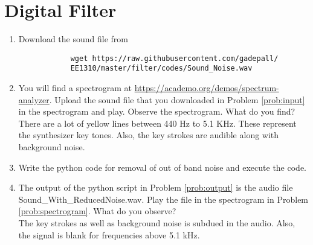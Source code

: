 \documentclass[journal,12pt,twocolumn]{IEEEtran}
\renewcommand\thesection{\arabic{section}}
\begin{document}
	\section{Digital Filter}
	\begin{enumerate}[label=\thesection.\arabic*
		,ref=\thesection.\theenumi]
		\item
		\label{prob:input}
		Download the sound file from  
		\begin{lstlisting}
			wget https://raw.githubusercontent.com/gadepall/ 
			EE1310/master/filter/codes/Sound_Noise.wav
		\end{lstlisting}
		\item
		\label{prob:spectrogram}
		You will find a spectrogram at \href{https://academo.org/demos/spectrum-analyzer}{\url{https://academo.org/demos/spectrum-analyzer}}. 
		Upload the sound file that you downloaded in Problem \ref{prob:input} in the spectrogram  and play.  Observe the spectrogram. What do you find?
		\\
		\solution There are a lot of yellow lines between 440 Hz to 5.1 KHz.  These represent the synthesizer key tones. Also, the key strokes
		are audible along with background noise.
		\item
		\label{prob:output}
		Write the python code for removal of out of band noise and execute the code.
		\\
		\solution
		
		\item
		The output of the python script in Problem \ref{prob:output} is the audio file Sound\_With\_ReducedNoise.wav. Play the file in the spectrogram in Problem \ref{prob:spectrogram}. What do you observe?
		\\
		\solution The key strokes as well as background noise is subdued in the audio.  Also,  the signal is blank for frequencies above 5.1 kHz.
		
	\end{enumerate}
\end{document}
